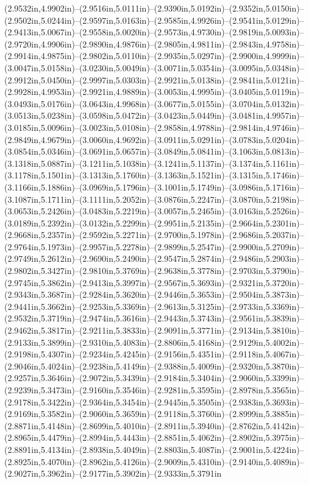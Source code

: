 (2.9532in,4.9902in)--(2.9516in,5.0111in)--(2.9390in,5.0192in)--(2.9352in,5.0150in)--(2.9502in,5.0244in)--(2.9597in,5.0163in)--(2.9585in,4.9926in)--(2.9541in,5.0129in)--(2.9413in,5.0067in)--(2.9558in,5.0020in)--(2.9573in,4.9730in)--(2.9819in,5.0093in)--(2.9720in,4.9906in)--(2.9890in,4.9876in)--(2.9805in,4.9811in)--(2.9843in,4.9758in)--(2.9914in,4.9875in)--(2.9802in,5.0110in)--(2.9935in,5.0297in)--(2.9900in,4.9999in)--(3.0047in,5.0158in)--(3.0230in,5.0049in)--(3.0071in,5.0354in)--(3.0095in,5.0348in)--(2.9912in,5.0450in)--(2.9997in,5.0303in)--(2.9921in,5.0138in)--(2.9841in,5.0121in)--(2.9928in,4.9953in)--(2.9921in,4.9889in)--(3.0053in,4.9995in)--(3.0405in,5.0119in)--(3.0493in,5.0176in)--(3.0643in,4.9968in)--(3.0677in,5.0155in)--(3.0704in,5.0132in)--(3.0513in,5.0238in)--(3.0598in,5.0472in)--(3.0423in,5.0449in)--(3.0481in,4.9957in)--(3.0185in,5.0096in)--(3.0023in,5.0108in)--(2.9858in,4.9788in)--(2.9814in,4.9746in)--(2.9849in,4.9679in)--(3.0060in,4.9692in)--(3.0911in,5.0291in)--(3.0783in,5.0204in)--(3.0854in,5.0346in)--(3.0691in,5.0657in)--(3.0849in,5.0841in)--(3.1063in,5.0813in)--(3.1318in,5.0887in)--(3.1211in,5.1038in)--(3.1241in,5.1137in)--(3.1374in,5.1161in)--(3.1178in,5.1501in)--(3.1313in,5.1760in)--(3.1363in,5.1521in)--(3.1315in,5.1746in)--(3.1166in,5.1886in)--(3.0969in,5.1796in)--(3.1001in,5.1749in)--(3.0986in,5.1716in)--(3.1087in,5.1711in)--(3.1111in,5.2052in)--(3.0876in,5.2247in)--(3.0870in,5.2198in)--(3.0653in,5.2426in)--(3.0483in,5.2219in)--(3.0057in,5.2465in)--(3.0163in,5.2526in)--(3.0189in,5.2392in)--(3.0132in,5.2299in)--(2.9951in,5.2135in)--(2.9664in,5.2301in)--(2.9668in,5.2357in)--(2.9592in,5.2271in)--(2.9700in,5.1978in)--(2.9686in,5.2037in)--(2.9764in,5.1973in)--(2.9957in,5.2278in)--(2.9899in,5.2547in)--(2.9900in,5.2709in)--(2.9749in,5.2612in)--(2.9690in,5.2490in)--(2.9547in,5.2874in)--(2.9486in,5.2903in)--(2.9802in,5.3427in)--(2.9810in,5.3769in)--(2.9638in,5.3778in)--(2.9703in,5.3790in)--(2.9745in,5.3862in)--(2.9413in,5.3997in)--(2.9567in,5.3693in)--(2.9321in,5.3720in)--(2.9343in,5.3687in)--(2.9284in,5.3620in)--(2.9446in,5.3653in)--(2.9504in,5.3873in)--(2.9441in,5.3662in)--(2.9253in,5.3369in)--(2.9613in,5.3125in)--(2.9733in,5.3369in)--(2.9532in,5.3719in)--(2.9474in,5.3616in)--(2.9443in,5.3743in)--(2.9561in,5.3839in)--(2.9462in,5.3817in)--(2.9211in,5.3833in)--(2.9091in,5.3771in)--(2.9134in,5.3810in)--(2.9133in,5.3899in)--(2.9310in,5.4083in)--(2.8806in,5.4168in)--(2.9129in,5.4002in)--(2.9198in,5.4307in)--(2.9234in,5.4245in)--(2.9156in,5.4351in)--(2.9118in,5.4067in)--(2.9046in,5.4024in)--(2.9238in,5.4149in)--(2.9388in,5.4009in)--(2.9320in,5.3870in)--(2.9257in,5.3646in)--(2.9072in,5.3439in)--(2.9184in,5.3404in)--(2.9060in,5.3399in)--(2.9239in,5.3473in)--(2.9160in,5.3546in)--(2.9281in,5.3595in)--(2.8978in,5.3565in)--(2.9178in,5.3422in)--(2.9364in,5.3454in)--(2.9445in,5.3505in)--(2.9383in,5.3693in)--(2.9169in,5.3582in)--(2.9060in,5.3659in)--(2.9118in,5.3760in)--(2.8999in,5.3885in)--(2.8871in,5.4148in)--(2.8699in,5.4010in)--(2.8911in,5.3940in)--(2.8762in,5.4142in)--(2.8965in,5.4479in)--(2.8994in,5.4443in)--(2.8851in,5.4062in)--(2.8902in,5.3975in)--(2.8891in,5.4134in)--(2.8938in,5.4049in)--(2.8803in,5.4087in)--(2.9001in,5.4224in)--(2.8925in,5.4070in)--(2.8962in,5.4126in)--(2.9009in,5.4310in)--(2.9140in,5.4089in)--(2.9027in,5.3962in)--(2.9177in,5.3902in)--(2.9333in,5.3791in